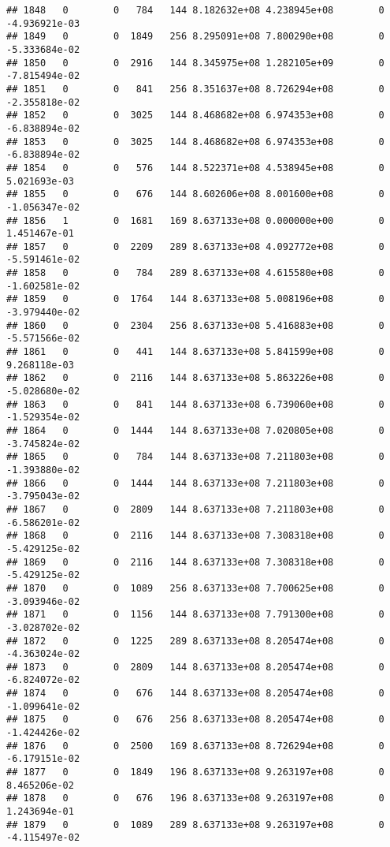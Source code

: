 \documentclass[
]{article}
\begin{document}
\begin{enumerate}
\begin{verbatim}
## 1848   0        0   784   144 8.182632e+08 4.238945e+08        0 -4.936921e-03
## 1849   0        0  1849   256 8.295091e+08 7.800290e+08        0 -5.333684e-02
## 1850   0        0  2916   144 8.345975e+08 1.282105e+09        0 -7.815494e-02
## 1851   0        0   841   256 8.351637e+08 8.726294e+08        0 -2.355818e-02
## 1852   0        0  3025   144 8.468682e+08 6.974353e+08        0 -6.838894e-02
## 1853   0        0  3025   144 8.468682e+08 6.974353e+08        0 -6.838894e-02
## 1854   0        0   576   144 8.522371e+08 4.538945e+08        0  5.021693e-03
## 1855   0        0   676   144 8.602606e+08 8.001600e+08        0 -1.056347e-02
## 1856   1        0  1681   169 8.637133e+08 0.000000e+00        0  1.451467e-01
## 1857   0        0  2209   289 8.637133e+08 4.092772e+08        0 -5.591461e-02
## 1858   0        0   784   289 8.637133e+08 4.615580e+08        0 -1.602581e-02
## 1859   0        0  1764   144 8.637133e+08 5.008196e+08        0 -3.979440e-02
## 1860   0        0  2304   256 8.637133e+08 5.416883e+08        0 -5.571566e-02
## 1861   0        0   441   144 8.637133e+08 5.841599e+08        0  9.268118e-03
## 1862   0        0  2116   144 8.637133e+08 5.863226e+08        0 -5.028680e-02
## 1863   0        0   841   144 8.637133e+08 6.739060e+08        0 -1.529354e-02
## 1864   0        0  1444   144 8.637133e+08 7.020805e+08        0 -3.745824e-02
## 1865   0        0   784   144 8.637133e+08 7.211803e+08        0 -1.393880e-02
## 1866   0        0  1444   144 8.637133e+08 7.211803e+08        0 -3.795043e-02
## 1867   0        0  2809   144 8.637133e+08 7.211803e+08        0 -6.586201e-02
## 1868   0        0  2116   144 8.637133e+08 7.308318e+08        0 -5.429125e-02
## 1869   0        0  2116   144 8.637133e+08 7.308318e+08        0 -5.429125e-02
## 1870   0        0  1089   256 8.637133e+08 7.700625e+08        0 -3.093946e-02
## 1871   0        0  1156   144 8.637133e+08 7.791300e+08        0 -3.028702e-02
## 1872   0        0  1225   289 8.637133e+08 8.205474e+08        0 -4.363024e-02
## 1873   0        0  2809   144 8.637133e+08 8.205474e+08        0 -6.824072e-02
## 1874   0        0   676   144 8.637133e+08 8.205474e+08        0 -1.099641e-02
## 1875   0        0   676   256 8.637133e+08 8.205474e+08        0 -1.424426e-02
## 1876   0        0  2500   169 8.637133e+08 8.726294e+08        0 -6.179151e-02
## 1877   0        0  1849   196 8.637133e+08 9.263197e+08        0  8.465206e-02
## 1878   0        0   676   196 8.637133e+08 9.263197e+08        0  1.243694e-01
## 1879   0        0  1089   289 8.637133e+08 9.263197e+08        0 -4.115497e-02

\end{verbatim}
\end{enumerate}
\end{document}

